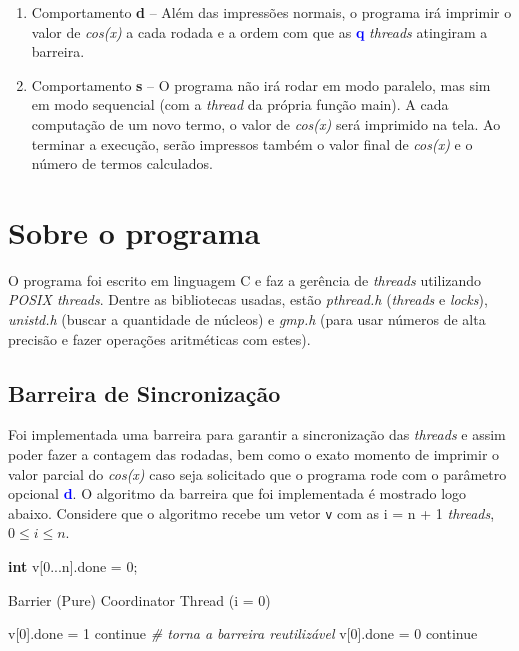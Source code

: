 \documentclass[11pt]{article}
\begin{document}
\begin{itemize}
\begin{enumerate}
	\item Comportamento \textbf{d} -- Além das impressões normais, o programa irá imprimir o valor de \textit{cos(x)} a cada rodada e a ordem com que as \textbf{\textcolor{blue}{q}} \textit{threads} atingiram a barreira.
	\item Comportamento \textbf{s} -- O programa não irá rodar em modo paralelo, mas sim em modo sequencial (com a \textit{thread} da própria função main). A cada computação de um novo termo, o valor de \textit{cos(x)} será imprimido na tela. Ao terminar a execução, serão impressos também o valor final de \textit{cos(x)} e o número de termos calculados.
	\end{enumerate}
\end{itemize}


\section{Sobre o programa}

O programa foi escrito em linguagem C e faz a gerência de \textit{threads} utilizando \textit{POSIX threads}. Dentre as bibliotecas usadas, estão \textit{pthread.h} (\textit{threads} e \textit{locks}), \textit{unistd.h} (buscar a quantidade de núcleos) e \textit{gmp.h} (para usar números de alta precisão e fazer operações aritméticas com estes).

\subsection{Barreira de Sincronização}

Foi implementada uma barreira para garantir a sincronização das \textit{threads} e assim poder fazer a contagem das rodadas, bem como o exato momento de imprimir o valor parcial do \textit{cos(x)} caso seja solicitado que o programa rode com o parâmetro opcional \textbf{\textcolor{blue}{d}}. O algoritmo da barreira que foi implementada é mostrado logo abaixo. Considere que o algoritmo recebe um vetor \texttt{v} com as i = n + 1 \textit{threads}, $0 \leq i \leq n$.

\begin{flushleft}
\textbf{int} v[0...n].done = 0;
\end{flushleft}

\begin{algorithm}[H]
\caption{Barrier (Pure) Coordinator Thread (i = 0)}
\begin{algorithmic}[1]
\State v[0].done = 1
\State continue
\EndWhile
\State \textit{\# torna a barreira reutilizável}
\State v[0].done = 0
\State continue
\EndWhile
\end{algorithmic}
\end{algorithm}
\end{document}
